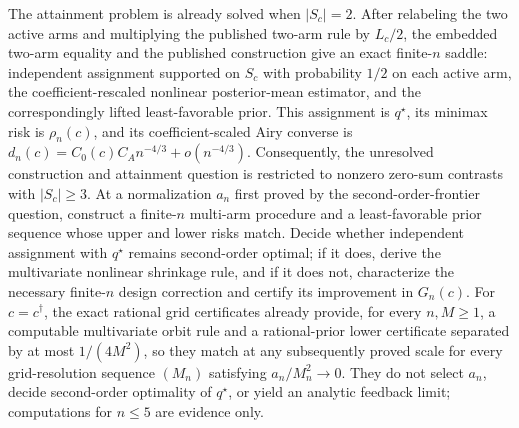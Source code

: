 The attainment problem is already solved when \(|S_c|=2\). After relabeling the two active arms and multiplying the published two-arm rule by \(L_c/2\), the embedded two-arm equality and the published construction give an exact finite-\(n\) saddle: independent assignment supported on \(S_c\) with probability \(1/2\) on each active arm, the coefficient-rescaled nonlinear posterior-mean estimator, and the correspondingly lifted least-favorable prior. This assignment is \(q^\star\), its minimax risk is \(\rho_n(c)\), and its coefficient-scaled Airy converse is \(d_n(c)=C_0(c)C_A n^{-4/3}+o(n^{-4/3})\). Consequently, the unresolved construction and attainment question is restricted to nonzero zero-sum contrasts with \(|S_c|\geq3\). At a normalization \(a_n\) first proved by the second-order-frontier question, construct a finite-\(n\) multi-arm procedure and a least-favorable prior sequence whose upper and lower risks match. Decide whether independent assignment with \(q^\star\) remains second-order optimal; if it does, derive the multivariate nonlinear shrinkage rule, and if it does not, characterize the necessary finite-\(n\) design correction and certify its improvement in \(G_n(c)\). For \(c=c^\dagger\), the exact rational grid certificates already provide, for every \(n,M\geq1\), a computable multivariate orbit rule and a rational-prior lower certificate separated by at most \(1/(4M^2)\), so they match at any subsequently proved scale for every grid-resolution sequence \((M_n)\) satisfying \(a_n/M_n^2\to0\). They do not select \(a_n\), decide second-order optimality of \(q^\star\), or yield an analytic feedback limit; computations for \(n\leq5\) are evidence only.